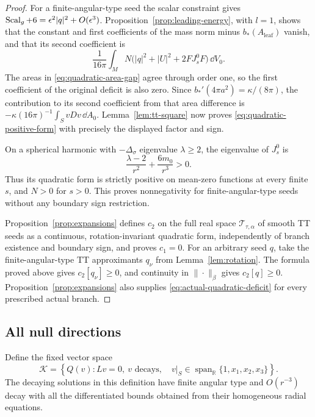 \begin{proof}
For a finite-angular-type seed the scalar constraint gives
$\operatorname{Scal}_g+6=\epsilon^2|q|^2+O(\epsilon^3)$.
Proposition~\ref{prop:leading-energy}, with $l=1$, shows that the
constant and first coefficients of the mass norm minus
$b_*(A_{\mathrm{leaf}})$ vanish, and that its second coefficient is
\[
 \frac1{16\pi}\int_M N\bigl(|q|^2+|U|^2+2FJ_s^0F\bigr)\,\dd V_0.
\]
The areas in \eqref{eq:quadratic-area-gap} agree through order one,
so the first coefficient of the original deficit is also zero.
Since $b_*'(4\pi a^2)=\kappa/(8\pi)$, the contribution to its second
coefficient from that area difference is
$-\kappa(16\pi)^{-1}\int_SvDv\,\dd A_0$.
Lemma~\ref{lem:tt-square} now proves
\eqref{eq:quadratic-positive-form} with precisely the displayed factor
and sign.

On a spherical harmonic with $-\Delta_\sigma$ eigenvalue $\lambda\geq2$,
the eigenvalue of $J_s^0$ is
\[
 \frac{\lambda-2}{r^2}+\frac{6m_0}{r^3}>0.
\]
Thus its quadratic form is strictly positive on mean-zero functions at
every finite $s$, and $N>0$ for $s>0$.
This proves nonnegativity for finite-angular-type seeds without any
boundary sign restriction.

Proposition~\ref{prop:expansions} defines \(c_2\) on the full real
space \(\mathscr T_{\tau,\alpha}\) of smooth TT seeds as a continuous,
rotation-invariant quadratic form, independently of branch existence
and boundary sign, and proves \(c_1=0\). For an arbitrary seed \(q\),
take the finite-angular-type TT approximants \(q_\nu\) from
Lemma~\ref{lem:rotation}. The formula proved above gives
\(c_2[q_\nu]\geq0\), and continuity in \(\|\cdot\|_\beta\) gives
\(c_2[q]\geq0\). Proposition~\ref{prop:expansions} also supplies
\eqref{eq:actual-quadratic-deficit} for every prescribed actual branch.
\end{proof}

\subsection{All null directions}

Define the fixed vector space
\begin{equation}
 \mathcal K=\left\{Q(v):Lv=0,\ v\text{ decays},\quad
 v|_S\in\operatorname{span}_{\mathbb R}\{1,x_1,x_2,x_3\}\right\}.
 \label{eq:kernel-space}
\end{equation}
The decaying solutions in this definition have finite angular type and
$O(r^{-3})$ decay with all the differentiated bounds obtained from
their homogeneous radial equations.

